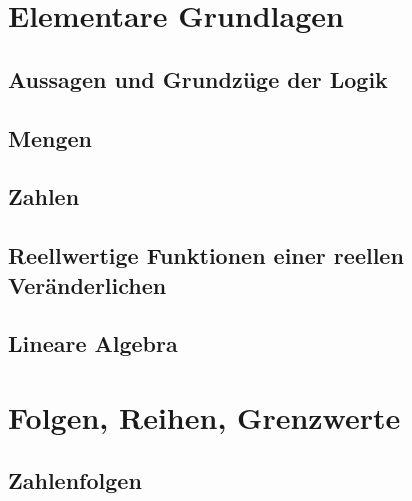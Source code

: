 




\maketitle
\newpage
\tableofcontents
\newpage

\chapter{Elementare Grundlagen}

\section{Aussagen und Grundzüge der Logik}
%

\section{Mengen}\label{sec:Mengen}
%

\section{Zahlen}
%

\section{Reellwertige Funktionen einer reellen Veränderlichen}
%

\section{Lineare Algebra}
%

\newpage
\chapter{Folgen, Reihen, Grenzwerte}
\section{Zahlenfolgen}
%

